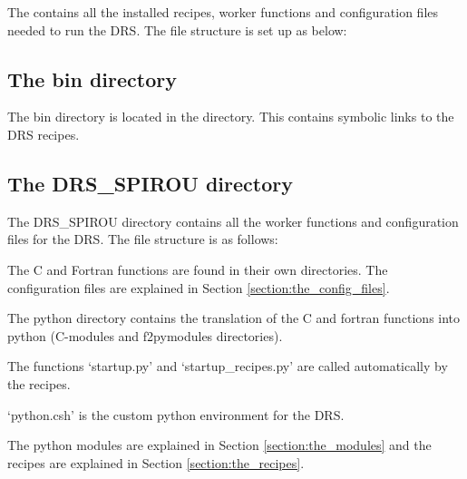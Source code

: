 The  contains all the installed recipes, worker functions and configuration files needed to run the DRS. The file structure is set up as below: 


\subsection{The bin directory}
\label{section:install_root_folder:bin_folder}

The bin directory is located in the  directory. This contains symbolic links to the DRS recipes.

\newpage

\subsection{The DRS\_SPIROU directory}
\label{section:install_root_folder:drs_spirou}

The DRS\_SPIROU directory contains all the worker functions and configuration files for the DRS. The file structure is as follows:


The C and Fortran functions are found in their own directories. The configuration files are explained in Section \ref{section:the_config_files}.

The python directory contains the translation of the C and fortran functions into python (C-modules and f2pymodules directories).

The functions `startup.py' and `startup\_recipes.py' are called automatically by the recipes.

`python.csh' is the custom python environment for the DRS.

The python modules are explained in Section \ref{section:the_modules} and the recipes are explained in Section \ref{section:the_recipes}.


